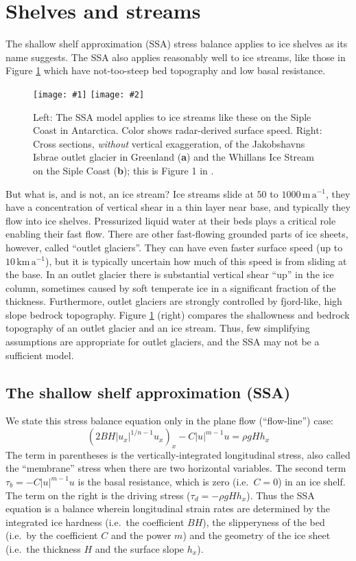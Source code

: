 \documentclass[letterpaper,final,12pt,reqno]{amsart}
\newcommand{\twofigsizes}[5]{
\begin{figure}[ht]
\centering
\texttt{[image: \#1]} \quad
\texttt{[image: \#2]}
\caption{#3}
\label{fig:#1}
\end{figure}}
\begin{document}
\section{Shelves and streams} \label{sec:shelvesandstreams}

The shallow shelf approximation (SSA) stress balance applies to ice shelves as its name suggests.  The SSA also applies reasonably well to ice streams, like those in Figure \ref{fig:siple} which have not-too-steep bed topography and low basal resistance.

\twofigsizes{siple}{streamisbrae}{Left:  The SSA model applies to ice streams like these on the Siple Coast in Antarctica.  Color shows radar-derived surface speed.  Right: Cross sections, \emph{without} vertical exaggeration, of the Jakobshavns Isbrae outlet glacier in Greenland (\textbf{a}) and the Whillans Ice Stream on the Siple Coast (\textbf{b}); this is Figure 1 in \cite{TrufferEchelmeyer}.}{2.8in}{2.9in}

But what is, and is not, an ice stream?  Ice streams slide at $50$ to $1000 \,\text{m}\,\text{a}^{-1}$, they have a concentration of vertical shear in a thin layer near base, and typically they flow into ice shelves.  Pressurized liquid water at their beds plays a critical role enabling their fast flow.  There are other fast-flowing grounded parts of ice sheets, however, called ``outlet glaciers''.  They can have even faster surface speed (up to $10 \,\text{km}\,\text{a}^{-1}$), but it is typically uncertain how much of this speed is from sliding at the base.  In an outlet glacier there is substantial vertical shear ``up'' in the ice column, sometimes caused by soft temperate ice in a significant fraction of the thickness.  Furthermore, outlet glaciers are strongly controlled by fjord-like, high slope bedrock topography.  Figure \ref{fig:siple} (right) compares the shallowness and bedrock topography of an outlet glacier and an ice stream.  Thus, few simplifying assumptions are appropriate for outlet glaciers, and the SSA may not be a sufficient model.

\subsection*{The shallow shelf approximation (SSA)}  We state this stress balance equation only in the plane flow (``flow-line'') case:
\begin{equation}
  \left(2 B H |u_x|^{1/n - 1} u_x\right)_x - C|u|^{m-1}u = \rho g H h_x \label{ssaearly}
\end{equation}
The term in parentheses is the vertically-integrated longitudinal stress, also called the ``membrane'' stress when there are two horizontal variables.  The second term $\tau_b = - C|u|^{m-1}u$ is the basal resistance, which is zero (i.e.~$C=0$) in an ice shelf.  The term on the right is the driving stress ($\tau_d = - \rho g H h_x$).  Thus the SSA equation is a balance wherein longitudinal strain rates are determined by the integrated ice hardness (i.e.~the coefficient $BH$), the slipperyness of the bed (i.e.~by the coefficient $C$ and the power $m$) and the geometry of the ice sheet (i.e.~the thickness $H$ and the surface slope $h_x$).
\end{document}
